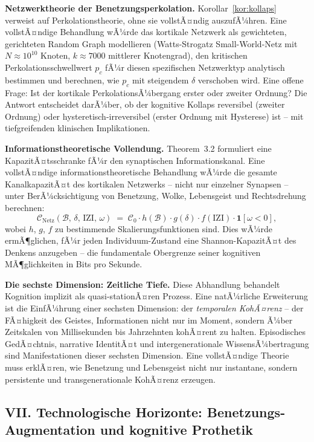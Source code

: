 ﻿\documentclass[12pt,a4paper]{report}
\theoremstyle{plain}
\theoremstyle{definition}
\theoremstyle{remark}
\begin{document}
	\textbf{Netzwerktheorie der Benetzungsperkolation.}
	Korollar~\ref{kor:kollaps} verweist auf Perkolationstheorie,
	ohne sie vollstÃ¤ndig auszufÃ¼hren.
	Eine vollstÃ¤ndige Behandlung wÃ¼rde das kortikale Netzwerk als
	gewichteten, gerichteten Random Graph modellieren
	(Watts-Strogatz Small-World-Netz mit $N \approx 10^{10}$ Knoten,
	$k \approx 7000$ mittlerer Knotengrad),
	den kritischen Perkolationsschwellwert $p_c$ fÃ¼r diesen
	spezifischen Netzwerktyp analytisch bestimmen
	und berechnen, wie $p_c$ mit steigendem $\delta$ verschoben wird.
	Eine offene Frage: Ist der kortikale PerkolationsÃ¼bergang
	erster oder zweiter Ordnung? Die Antwort entscheidet darÃ¼ber,
	ob der kognitive Kollaps reversibel (zweiter Ordnung) oder
	hysteretisch-irreversibel (erster Ordnung mit Hysterese) ist --
	mit tiefgreifenden klinischen Implikationen.

	\textbf{Informationstheoretische Vollendung.}
	Theorem~3.2 formuliert eine KapazitÃ¤tsschranke fÃ¼r den synaptischen
	Informationskanal. Eine vollstÃ¤ndige informationstheoretische Behandlung
	wÃ¼rde die gesamte KanalkapazitÃ¤t des kortikalen Netzwerks --
	nicht nur einzelner Synapsen -- unter BerÃ¼cksichtigung von
	Benetzung, Wolke, Lebensgeist und Rechtsdrehung berechnen:
	\[
	\mathcal{C}_{\mathrm{Netz}}(\mathcal{B},\,\delta,\,\mathrm{IZI},\,\omega)
	\;=\; \mathcal{C}_0
	\cdot h(\mathcal{B})\cdot g(\delta)\cdot f(\mathrm{IZI})\cdot \mathbf{1}[\omega < 0],
	\]
	wobei $h$, $g$, $f$ zu bestimmende Skalierungsfunktionen sind.
	Dies wÃ¼rde ermÃ¶glichen, fÃ¼r jeden Individuum-Zustand eine
	Shannon-KapazitÃ¤t des Denkens anzugeben -- die fundamentale
	Obergrenze seiner kognitiven MÃ¶glichkeiten in Bits pro Sekunde.

	\textbf{Die sechste Dimension: Zeitliche Tiefe.}
	Diese Abhandlung behandelt Kognition implizit als quasi-stationÃ¤ren
	Prozess. Eine natÃ¼rliche Erweiterung ist die EinfÃ¼hrung einer
	sechsten Dimension: der \emph{temporalen KohÃ¤renz} --
	der FÃ¤higkeit des Geistes, Informationen nicht nur im Moment,
	sondern Ã¼ber Zeitskalen von Millisekunden bis Jahrzehnten
	kohÃ¤rent zu halten.
	Episodisches GedÃ¤chtnis, narrative IdentitÃ¤t und
	intergenerationale WissensÃ¼bertragung sind Manifestationen
	dieser sechsten Dimension.
	Eine vollstÃ¤ndige Theorie muss erklÃ¤ren, wie Benetzung und Lebensgeist
	nicht nur instantane, sondern persistente und transgenerationale
	KohÃ¤renz erzeugen.

	\subsection*{VII. Technologische Horizonte: Benetzungs-Augmentation
		und kognitive Prothetik}
\end{document}
